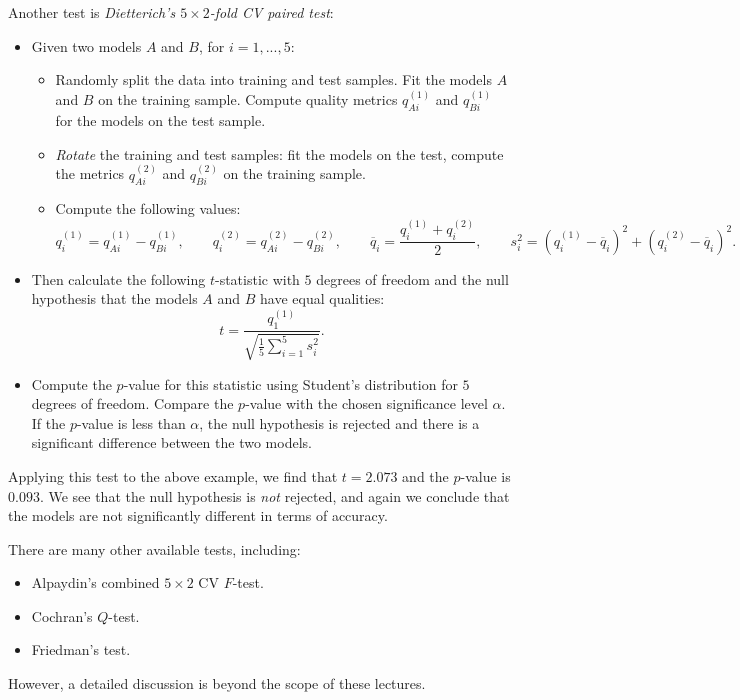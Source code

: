 Another test is \textit{Dietterich's $5\times2$-fold CV paired test}:
\begin{itemize}
\item Given two models $A$ and $B$, for $i=1,...,5$:
\begin{itemize}
\item Randomly split the data into training and test samples. Fit the models $A$ and $B$ on the training sample. Compute quality metrics $q_{Ai}^{(1)}$ and $q_{Bi}^{(1)}$ for the models on the test sample.
\item \textit{Rotate} the training and test samples: fit the models on the test, compute the metrics $q_{Ai}^{(2)}$ and $q_{Bi}^{(2)}$ on the training sample.
\item Compute the following values:
\begin{equation*}
q_i^{(1)} = q_{Ai}^{(1)} - q_{Bi}^{(1)}, \qquad q_i^{(2)} = q_{Ai}^{(2)} - q_{Bi}^{(2)}, \qquad \overline{q}_i = \frac{q_i^{(1)} + q_i^{(2)}}{2}, \qquad s_i^2 = (q_i^{(1)} - \overline{q}_i)^2 + (q_i^{(2)} - \overline{q}_i)^2.
\end{equation*}
\end{itemize}
\item Then calculate the following $t$-statistic with $5$ degrees of freedom and the null hypothesis that the models $A$ and $B$ have equal qualities:
\begin{equation*}
t = \frac{q_1^{(1)}}{\sqrt{\displaystyle \frac{1}{5} \sum_{i=1}^{5} s_i^2}}.
\end{equation*}
\item Compute the $p$-value for this statistic using Student's distribution for $5$ degrees of freedom. Compare the $p$-value with the chosen significance level $\alpha$. If the $p$-value is less than $\alpha$, the null hypothesis is rejected and there is a significant difference between the two models.
\end{itemize}

\newpage
\begin{frameex}
Applying this test to the above example, we find that $t = 2.073$ and the $p$-value is $0.093$. We see that the null hypothesis is \textit{not} rejected, and again we conclude that the models are not significantly different in terms of accuracy.
\end{frameex}

There are many other available tests, including:
\begin{itemize}
\item Alpaydin's combined $5 \times 2$ CV $F$-test.
\item Cochran's $Q$-test.
\item Friedman's test.
\end{itemize}
However, a detailed discussion is beyond the scope of these lectures.




